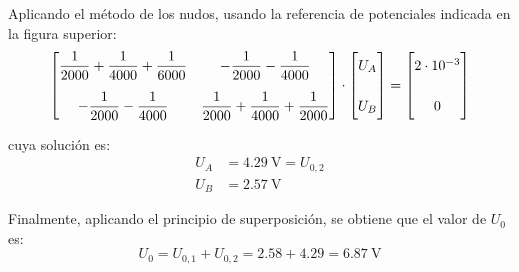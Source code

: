 \begin{example}
    Aplicando el método de los nudos, usando la referencia de potenciales indicada en la figura superior:
    \begin{equation*}
        \begin{bmatrix}
            \dfrac{1}{2000} + \dfrac{1}{4000} + \dfrac{1}{6000} & -\dfrac{1}{2000} -\dfrac{1}{4000}\\[12pt]
            -\dfrac{1}{2000} -\dfrac{1}{4000} & \dfrac{1}{2000} + \dfrac{1}{4000} + \dfrac{1}{2000}
        \end{bmatrix}
        \cdot
        \begin{bmatrix}
            \vphantom{\dfrac{1}{2000}} U_A\\[12pt]
            \vphantom{\dfrac{1}{2000}} U_B
        \end{bmatrix}
        =
        \begin{bmatrix}
            \vphantom{\dfrac{1}{2000}} 2\cdot 10^{-3}\\[12pt]
            \vphantom{\dfrac{1}{2000}} 0
        \end{bmatrix}
    \end{equation*}

    \vspace{3mm}
    cuya solución es:
    \begin{align*}
        U_A &= \qty{4.29}{\volt} = U_{0,2}\\
        U_B &= \qty{2.57}{\volt}
    \end{align*}
    
    \vspace{1mm}
    Finalmente, aplicando el principio de superposición, se obtiene que el valor de $U_0$ es:
    \begin{equation*}
        U_0 = U_{0,1} + U_{0,2} = 2.58 + 4.29 = \boxed{\qty{6.87}{\volt}}
    \end{equation*}
\end{example}




